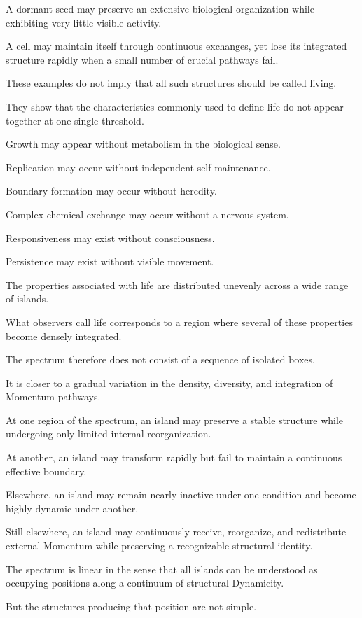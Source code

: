 A dormant seed may preserve an extensive biological organization while exhibiting very little visible activity.

A cell may maintain itself through continuous exchanges, yet lose its integrated structure rapidly when a small number of crucial pathways fail.

These examples do not imply that all such structures should be called living.

They show that the characteristics commonly used to define life do not appear together at one single threshold.

Growth may appear without metabolism in the biological sense.

Replication may occur without independent self-maintenance.

Boundary formation may occur without heredity.

Complex chemical exchange may occur without a nervous system.

Responsiveness may exist without consciousness.

Persistence may exist without visible movement.

The properties associated with life are distributed unevenly across a wide range of islands.

What observers call life corresponds to a region where several of these properties become densely integrated.

The spectrum therefore does not consist of a sequence of isolated boxes.

It is closer to a gradual variation in the density, diversity, and integration of Momentum pathways.

At one region of the spectrum, an island may preserve a stable structure while undergoing only limited internal reorganization.

At another, an island may transform rapidly but fail to maintain a continuous effective boundary.

Elsewhere, an island may remain nearly inactive under one condition and become highly dynamic under another.

Still elsewhere, an island may continuously receive, reorganize, and redistribute external Momentum while preserving a recognizable structural identity.

The spectrum is linear in the sense that all islands can be understood as occupying positions along a continuum of structural Dynamicity.

But the structures producing that position are not simple.

